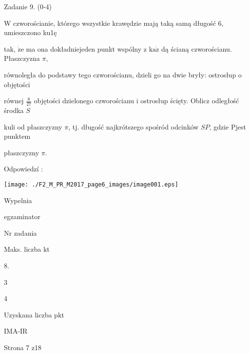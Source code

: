 \documentclass[a4paper,12pt]{article}
\begin{document}
Zadanie 9. (0-4)

$\mathrm{W}$ czworościanie, którego wszystkie krawędzie mają taką samą długość 6, umieszczono ku1ę

tak, $\dot{\mathrm{z}}\mathrm{e}$ ma ona dokładniejeden punkt wspólny z $\mathrm{k}\mathrm{a}\dot{\mathrm{z}}$ dą ścianą czworościanu. Płaszczyzna $\pi,$

równoległa do podstawy tego czworościanu, dzieli go na dwie bryły: ostrosłup o objętości

równej $\displaystyle \frac{8}{27}$ objętości dzielonego czworościanu i ostrosłup ścięty. Oblicz odległość środka $S$

kuli od płaszczyzny $\pi$, tj. długość najkrótszego spośród odcinków $SP$, gdzie Pjest punktem

płaszczyzny $\pi.$

Odpowiedzí :
\begin{center}
\texttt{[image: ./F2\_M\_PR\_M2017\_page6\_images/image001.eps]}
\end{center}
Wypelnia

egzaminator

Nr zadania

Maks. liczba kt

8.

3

4

Uzyskana liczba pkt

IMA-IR

Strona 7 z18
\end{document}
